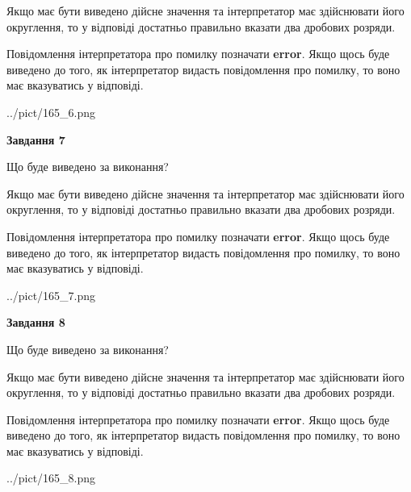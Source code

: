\documentclass[12pt, ukrainian]{article}
\begin{document}
{\begin {Large}
Якщо має бути виведено дійсне значення та інтерпретатор має здійснювати його округлення, 
то у відповіді достатньо правильно вказати два дробових розряди.

Повідомлення інтерпретатора про помилку позначати \textbf{error}.
Якщо щось буде виведено до того, як інтерпретатор видасть повідомлення про помилку, 
то воно має вказуватись у відповіді. \par

\begin{center}
	{../pict/165_6.png}
\end{center}
\newpage

{\begin {center}\textbf{Завдання 7}\end {center}}\par
Що буде виведено за виконання? \par

Якщо має бути виведено дійсне значення та інтерпретатор має здійснювати його округлення, 
то у відповіді достатньо правильно вказати два дробових розряди.

Повідомлення інтерпретатора про помилку позначати \textbf{error}.
Якщо щось буде виведено до того, як інтерпретатор видасть повідомлення про помилку, 
то воно має вказуватись у відповіді. \par

\begin{center}
	{../pict/165_7.png}
\end{center}
\newpage

{\begin {center}\textbf{Завдання 8}\end {center}}\par
Що буде виведено за виконання? \par

Якщо має бути виведено дійсне значення та інтерпретатор має здійснювати його округлення, 
то у відповіді достатньо правильно вказати два дробових розряди.

Повідомлення інтерпретатора про помилку позначати \textbf{error}.
Якщо щось буде виведено до того, як інтерпретатор видасть повідомлення про помилку, 
то воно має вказуватись у відповіді. \par

\begin{center}
	{../pict/165_8.png}
\end{center}
\newpage


\end{Large}}
\end{document}

